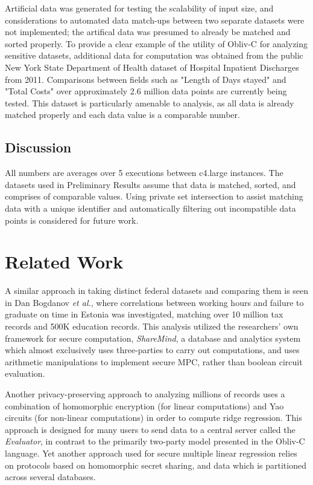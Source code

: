 \documentclass[conference]{IEEEtran}
\begin{document}
Artificial data was generated for testing the scalability of input size, and
considerations to automated data match-ups between two separate datasets were not
implemented; the artifical data was presumed to already be matched and sorted properly.
To provide a clear example of the utility of Obliv-C for analyzing sensitive datasets, 
additional data for computation was obtained from the public New York State Department 
of Health dataset of Hospital Inpatient Discharges from 2011\cite{healthdata:ny}. 
Comparisons between fields such as "Length of Days stayed" and "Total Costs" 
over approximately 2.6 million data points are currently being tested.
This dataset is particularly amenable to analysis, as all data is already 
matched properly and each data value is a comparable number.

\subsection{Discussion}
All numbers are averages over 5 executions between c4.large instances. The datasets used in Preliminary Results assume that data is matched, sorted, and 
comprises of comparable values. Using private set intersection to assist matching 
data with a unique identifier and automatically filtering out incompatible 
data points is considered for future work.

\section{Related Work}
A similar approach in taking distinct federal datasets and comparing them is seen in
Dan Bogdanov \emph{et al.}, where correlations between working hours and failure to
graduate on time in Estonia was investigated, matching over 10 million 
tax records and 500K education records\cite{cryptoeprint:2015:1159}.
This analysis utilized the researchers' own framework for secure
computation, \emph{ShareMind}, a database and analytics system which 
almost exclusively uses three-parties to carry out computations, and uses arithmetic
manipulations to implement secure MPC, rather than boolean circuit evaluation\cite{sharemind}.

Another privacy-preserving approach to analyzing millions of records uses a
combination of homomorphic encryption (for linear computations) and Yao circuits 
(for non-linear computations) in order to compute ridge regression\cite{ridgeregression}.
This approach is designed for many users to send data to a central server called the 
\emph{Evaluator}, in contrast to the primarily two-party model presented in the Obliv-C
language. Yet another approach used for secure multiple linear regression 
relies on protocols based on homomorphic secret sharing, and data which is partitioned 
across several databases\cite{secretsharing}.
 
\end{document}
